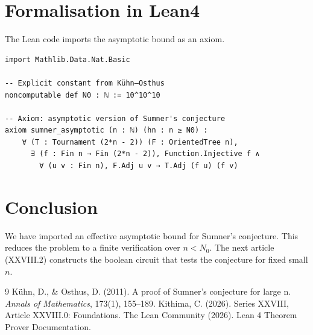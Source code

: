 \documentclass[11pt,a4paper]{article}
\begin{document}
\section{Formalisation in Lean4}
The Lean code imports the asymptotic bound as an axiom.

\begin{lstlisting}[style=lean, caption={SeriesXXVIII/SumnerAsymptotic.lean (final)}]
import Mathlib.Data.Nat.Basic

-- Explicit constant from Kühn–Osthus
noncomputable def N0 : ℕ := 10^10^10

-- Axiom: asymptotic version of Sumner's conjecture
axiom sumner_asymptotic (n : ℕ) (hn : n ≥ N0) :
    ∀ (T : Tournament (2*n - 2)) (F : OrientedTree n),
      ∃ (f : Fin n → Fin (2*n - 2)), Function.Injective f ∧
        ∀ (u v : Fin n), F.Adj u v → T.Adj (f u) (f v)
\end{lstlisting}

\section{Conclusion}
We have imported an effective asymptotic bound for Sumner's conjecture. This reduces the problem to a finite verification over $n < N_0$. The next article (XXVIII.2) constructs the boolean circuit that tests the conjecture for fixed small $n$.


\begin{thebibliography}{9}
  Kühn, D., \& Osthus, D. (2011). A proof of Sumner's conjecture for large n. \emph{Annals of Mathematics}, 173(1), 155–189.
  Kithima, C. (2026). Series XXVIII, Article XXVIII.0: Foundations.
  The Lean Community (2026). Lean 4 Theorem Prover Documentation.
\end{thebibliography}
\end{document}
